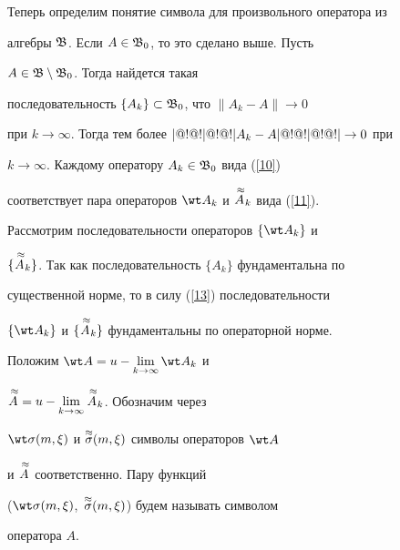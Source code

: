 Теперь определим понятие символа для произвольного оператора из


алгебры $\frak B$. Если $A\in\frak B_0$, то это сделано выше. Пусть


$A\in\frak B\setminus\frak B_0$. Тогда найдется такая


последовательность $\{A_k\}\subset\frak B_0$, что $\|A_k-A\|\to 0$


при $k\to\infty$. Тогда тем более $|@!@!|@!@!| A_k-A|@!@!|@!@!|\to 0$ при


$k\to\infty$. Каждому оператору $A_k\in\frak B_0$ вида (\ref{10})


соответствует пара операторов $\wt A_k$ и $\overset{\;\approx}{A}{}_k$ вида (\ref{11}).


Рассмотрим последовательности операторов $\{\wt A_k\}$ и


$\{\overset{\;\approx}{A}{}_k\}$. Так как последовательность $\{A_k\}$ фундаментальна по


существенной норме, то в силу (\ref{13}) последовательности


$\{\wt A_k\}$ и $\{\overset{\;\approx}{A}{}_k\}$ фундаментальны по операторной норме.


Положим $\dst\wt A=u-\lim_{k\to\infty}\wt A_k$ и


$\displaystyle \overset{\;\approx}{A}{}=u-\lim_{k\to\infty} \overset{\;\approx}{A}{}_k$. Обозначим через


$\wt\sigma(m,\xi)$ и $\overset{\approx}{\sigma}{}(m,\xi)$ символы операторов $\wt A$


и $\overset{\;\approx}{A}{}$ соответственно. Пару функций


($\wt\sigma(m,\xi)$,\ $\overset{\approx}{\sigma}{}(m,\xi)$) будем называть символом


оператора $A$.





